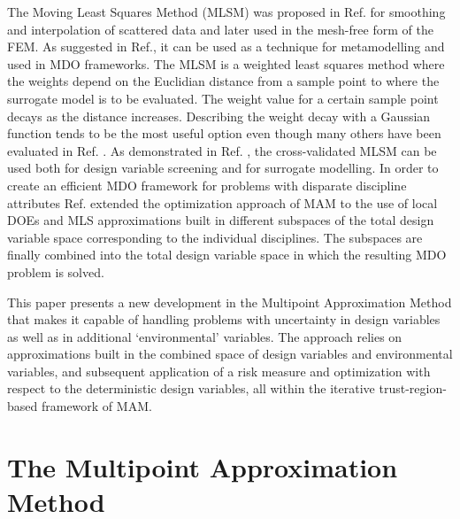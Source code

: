 \documentclass[10pt,twocolumn,a4paper]{article}
\begin{document}
The Moving Least Squares Method (MLSM) was proposed in Ref. \cite{LancasterSalkauskas1981} for smoothing and interpolation of scattered data and later used in the mesh-free form of the FEM\cite{Liszka1984}. As suggested in Ref.\cite{ChoiYounYang2001}, it can be used as a technique for metamodelling and used in MDO frameworks. The MLSM is a weighted least squares method where the weights depend on the Euclidian distance from a sample point to where the surrogate model is to be evaluated. The weight value for a certain sample point decays as the distance increases. Describing the weight decay with a Gaussian function tends to be the most useful option even though many others have been evaluated in Ref. \cite{ToropovSchrammSahaiJones2005}. As demonstrated in Ref. \cite{PolynkinToropov2010}, the cross-validated MLSM can be used both for design variable screening and for surrogate modelling. In order to create an efficient MDO framework for problems with disparate discipline attributes Ref. \cite{OllarToropovJones2014} extended the optimization approach of MAM to the use of local DOEs and MLS approximations built in different subspaces of the total design variable space corresponding to the individual disciplines. The subspaces are finally combined into the total design variable space in which the resulting MDO problem is solved.

This paper presents a new development in the Multipoint Approximation Method that makes it capable of handling problems with uncertainty in design variables as well as in additional ‘environmental’ variables. The approach relies on approximations built in the combined space of design variables and environmental variables, and subsequent application of a risk measure and optimization with respect to the deterministic design variables, all within the iterative trust-region-based framework of MAM.

\section{The Multipoint Approximation Method}
\label{sec:MAM}
\end{document}
